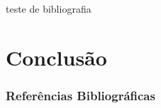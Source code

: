 \documentclass{beamer}
\begin{document}
\begin{frame}
teste de bibliografia\cite{doge}
\end{frame}

\section{Conclusão}
\begin{frame}%
    \frametitle{Referências Bibliográficas}
    \tiny{}
    
\end{frame}
\end{document}
